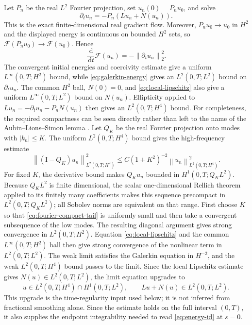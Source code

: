 \documentclass[11pt]{article}
\numberwithin{equation}{section}
\theoremstyle{definition}
\newcommand{\cF}{\mathcal F}
\newcommand{\Id}{\mathrm I}
\newcommand{\dd}{\,\mathrm d}
\newcommand{\norm}[1]{\left\lVert#1\right\rVert}
\begin{document}
Let $P_n$ be the real $L^2$ Fourier projection, set
$u_n(0)=P_nu_0$, and solve
\begin{equation}
 \partial_tu_n=-P_n(Lu_n+N(u_n)).
 \label{eq:galerkin}
\end{equation}
This is the exact finite-dimensional real gradient flow.  Moreover,
$P_nu_0\to u_0$ in $H^2$ and the displayed energy is continuous on bounded
$H^2$ sets, so $\cF(P_nu_0)\to\cF(u_0)$.  Hence
\begin{equation}
 \frac{\dd}{\dd t}\cF(u_n)=-\norm{\partial_tu_n}_2^2.
 \label{eq:galerkin-energy}
\end{equation}
The convergent initial energies and coercivity estimate give a uniform
$L^\infty(0,T;H^2)$ bound, while \eqref{eq:galerkin-energy} gives an
$L^2(0,T;L^2)$ bound on $\partial_tu_n$.  The common $H^2$ ball,
$N(0)=0$, and \eqref{eq:local-lipschitz} also give a uniform
$L^\infty(0,T;L^2)$ bound on $N(u_n)$.  Ellipticity applied to
$Lu_n=-\partial_tu_n-P_nN(u_n)$ then gives an $L^2(0,T;H^4)$ bound.
For completeness, the required compactness can be seen directly rather than
left to the name of the Aubin--Lions--Simon lemma \cite{SimonCompactness}.
Let $Q_K$ be the real Fourier projection onto modes with $|k_n|\le K$.
The uniform $L^2(0,T;H^4)$ bound gives the high-frequency estimate
\begin{equation}
 \norm{(\Id-Q_K)u_n}_{L^2(0,T;H^2)}^2
 \le C(1+K^2)^{-2}\norm{u_n}_{L^2(0,T;H^4)}^2.
 \label{eq:fourier-compact-tail}
\end{equation}
For fixed $K$, the derivative bound makes $Q_Ku_n$ bounded in
$H^1(0,T;Q_KL^2)$.  Because $Q_KL^2$ is finite dimensional, the scalar
one-dimensional Rellich theorem applied to its finitely many coefficients
makes this sequence precompact in $L^2(0,T;Q_KL^2)$; all Sobolev norms are
equivalent on that range.  First choose $K$ so that
\eqref{eq:fourier-compact-tail} is uniformly small and then take a convergent
subsequence of the low modes.  The resulting diagonal argument gives strong
convergence in $L^2(0,T;H^2)$.  Equation \eqref{eq:local-lipschitz} and the
common $L^\infty(0,T;H^2)$ ball then give strong convergence of the nonlinear
term in $L^2(0,T;L^2)$.  The weak limit satisfies the Galerkin equation in
$H^{-2}$, and the weak $L^2(0,T;H^4)$ bound passes to the limit.  Since the
local Lipschitz estimate gives $N(u)\in L^2(0,T;L^2)$, the limit equation
upgrades to
\begin{equation}
 u\in L^2(0,T;H^4)\cap H^1(0,T;L^2),\qquad
 Lu+N(u)\in L^2(0,T;L^2).
 \label{eq:time-regularity-upgrade}
\end{equation}
This upgrade is the time-regularity input used below; it is not inferred from
fractional smoothing alone.  Since the estimate holds on the full interval
$(0,T)$, it also supplies the endpoint integrability needed to read
\eqref{eq:energy-id} at $s=0$.
\end{document}
